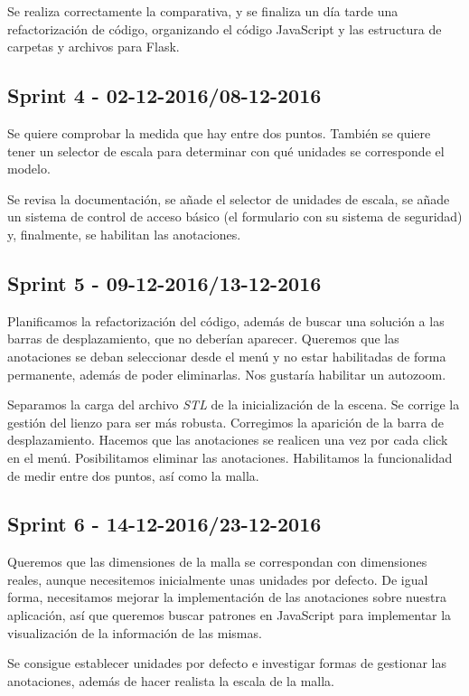 Se realiza correctamente la comparativa, y se finaliza un día tarde una refactorización de código, organizando el código JavaScript y las estructura de carpetas y archivos para Flask.

\subsection{Sprint 4 - 02-12-2016/08-12-2016}
Se quiere comprobar la medida que hay entre dos puntos. También se quiere tener un selector de escala para determinar con qué unidades se corresponde el modelo. 

Se revisa la documentación, se añade el selector de unidades de escala, se añade un sistema de control de acceso básico (el formulario con su sistema de seguridad) y, finalmente, se habilitan las anotaciones.

\subsection{Sprint 5 - 09-12-2016/13-12-2016}
Planificamos la refactorización del código, además de buscar una solución a las barras de desplazamiento, que no deberían aparecer. Queremos que las anotaciones se deban seleccionar desde el menú y no estar habilitadas de forma permanente, además de poder eliminarlas. Nos gustaría habilitar un autozoom.

Separamos la carga del archivo \textit{STL} de la inicialización de la escena. Se corrige la gestión del lienzo para ser más robusta. Corregimos la aparición de la barra de desplazamiento. Hacemos que las anotaciones se realicen una vez por cada click en el menú. Posibilitamos eliminar las anotaciones. Habilitamos la funcionalidad de medir entre dos puntos, así como la malla.


\subsection{Sprint 6 - 14-12-2016/23-12-2016}
Queremos que las dimensiones de la malla se correspondan con dimensiones reales, aunque necesitemos inicialmente unas unidades por defecto. De igual forma, necesitamos mejorar la implementación de las anotaciones sobre nuestra aplicación, así que queremos buscar patrones en JavaScript para implementar la visualización de la información de las mismas.

Se consigue establecer unidades por defecto e investigar formas de gestionar las anotaciones, además de hacer realista la escala de la malla.

